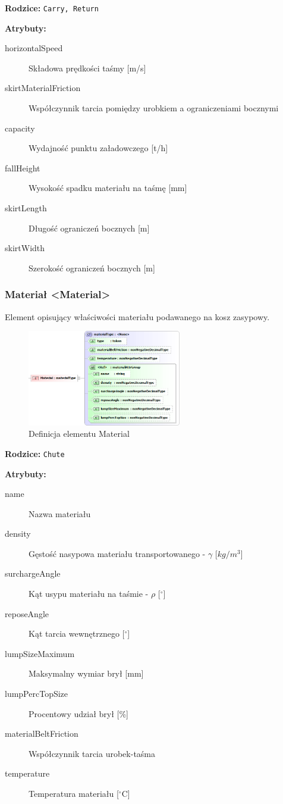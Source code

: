 \documentclass[12pt,a4paper]{article}
\begin{document}
\noindent\textbf{Rodzice:} \texttt{Carry, Return}

\noindent\textbf{Atrybuty:}
\begin{description}
\item[horizontalSpeed] Składowa prędkości taśmy [m/s]
\item[skirtMaterialFriction] Współczynnik tarcia pomiędzy urobkiem a
  ograniczeniami bocznymi
\item[capacity] Wydajność punktu załadowczego [t/h]
\item[fallHeight] Wysokość spadku materiału na taśmę [mm]
\item[skirtLength] Długość ograniczeń bocznych [m]
\item[skirtWidth] Szerokość ograniczeń bocznych [m]
\end{description}


\subsubsection{Materiał <Material>}
Element opisujący właściwości materiału podawanego na kosz zasypowy.

\begin{figure}[H]
  \centering
  \includegraphics[width=0.6\textwidth]{png/liquid/Material}
  \caption{Definicja elementu Material}
  \label{fig:material-xsd}
\end{figure}

\noindent\textbf{Rodzice:} \texttt{Chute}

\noindent\textbf{Atrybuty:}
\begin{description}
\item[name] Nazwa materiału
\item[density] Gęstość nasypowa materiału transportowanego - $\gamma$ [$kg/m^3$]
\item[surchargeAngle] Kąt usypu materiału na taśmie - $\rho$ [$^\circ$]
\item[reposeAngle] Kąt tarcia wewnętrznego [$^\circ$]
\item[lumpSizeMaximum] Maksymalny wymiar brył [mm]
\item[lumpPercTopSize] Procentowy udział brył [\%]
\item[materialBeltFriction] Współczynnik tarcia urobek-taśma
\item[temperature] Temperatura materiału [$^\circ$C]
\end{description}
\end{document}
